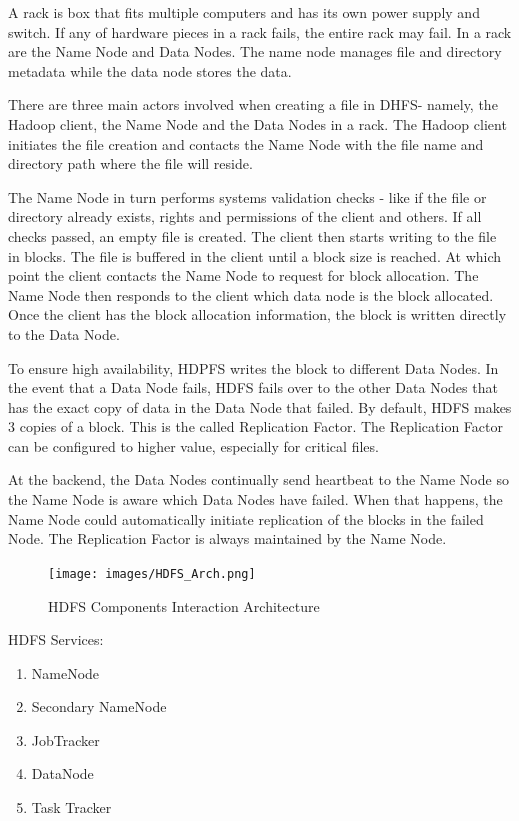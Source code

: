 A rack is box that fits multiple computers and has its own power 
supply and switch. If any of hardware pieces in a rack fails, the 
entire rack may fail. In a rack are the Name Node and Data Nodes.
The name node manages file and directory metadata while the data node
stores the data.

There are three main actors involved when creating a file in DHFS- 
namely, the Hadoop client, the Name Node and the Data Nodes in a
rack. The Hadoop client initiates the file creation and contacts
the Name Node with the file name and directory path where the file 
will reside.

The Name Node in turn performs systems validation checks - like if 
the file or directory already exists, rights and permissions of the
client and others. If all checks passed, an empty file is created. 
The client then starts writing to the file in blocks. The file is 
buffered in the client until a block size is reached. At which point 
the client contacts the Name Node to request for block allocation. 
The Name Node then responds to the client which data node is the 
block allocated. Once the client has the block allocation 
information, the block is written directly to the Data Node.

To ensure high availability, HDPFS writes the block to different Data
Nodes. In the event that a Data Node fails, HDFS fails over to the 
other Data Nodes that has the exact copy of data in the Data Node 
that failed. By default, HDFS makes 3 copies of a block. This is the 
called Replication Factor. The Replication Factor can be configured 
to higher value, especially for critical files.

At the backend, the Data Nodes continually send heartbeat to the Name
Node so the Name Node is aware which Data Nodes have failed. When 
that happens, the Name Node could automatically initiate replication 
of the blocks in the failed Node. The Replication Factor is always 
maintained by the Name Node. 

\begin{figure}[!ht]
\centering\texttt{[image: images/HDFS\_Arch.png]}
  \caption{HDFS Components Interaction Architecture}\label{f:hdfs-arch}
\end{figure}

HDFS Services:

\begin{enumerate}
	\item NameNode
	\item Secondary NameNode
	\item JobTracker
	\item DataNode
	\item Task Tracker
\end{enumerate}

